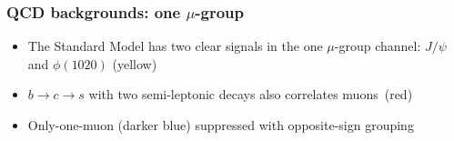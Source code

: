 \documentclass[compress]{beamer}
\begin{document}
\begin{frame}
\frametitle{QCD backgrounds: one $\mu$-group}

\begin{itemize}
\item The Standard Model has two clear signals in the one $\mu$-group
  channel: $J/\psi$ and $\phi(1020)$ (yellow)
\item $b \to c \to s$ with two semi-leptonic decays also correlates \mbox{muons (red)\hspace{-1 cm}}
\item<2> Only-one-muon (darker blue) suppressed with
  opposite-sign grouping
\end{itemize}

\end{frame}
\end{document}
